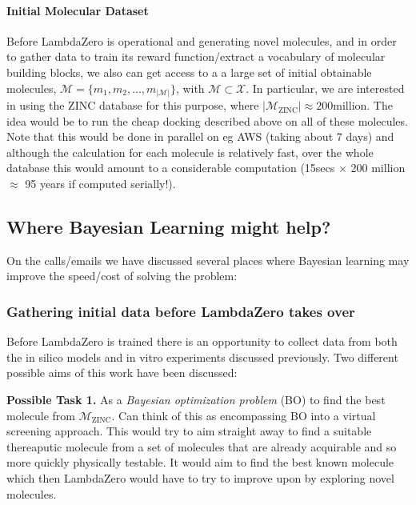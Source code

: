 \documentclass{article}
\begin{document}
\paragraph{Initial Molecular Dataset} Before LambdaZero is operational and generating novel molecules, and in order to gather data to train its reward function/extract a vocabulary of molecular building blocks,
we also can get access to a a large set of initial obtainable molecules, $\mathcal{M} = \{m_1, m_2, \ldots, m_{|\mathcal{M}|}\}$,
with $\mathcal{M} \subset \mathcal{X}$.
In particular, we are interested in using the ZINC database \citep{Irwin2012-gf} for this purpose,
where $|\mathcal{M}_{\textrm{ZINC}}| \approx 200 \textrm{million}$. 
The idea would be to run the cheap docking described above on all of these molecules.
Note that this would be done in parallel on eg AWS (taking about 7 days) and although the calculation for each molecule is relatively fast,
over the whole database
this would amount to a considerable computation (15secs $\times$ 200 million $\approx$ 95 years if computed serially!).

\subsection{Where Bayesian Learning might help?}

On the calls/emails we have discussed several places where Bayesian learning may improve the speed/cost of solving the problem:

\subsubsection{Gathering initial data before LambdaZero takes over}
Before LambdaZero is trained there is an opportunity to collect data from both the in silico models and in vitro experiments 
discussed previously.
Two different possible aims of this work have been discussed:

\vspace{0.1cm}
\noindent
\textbf{Possible Task 1.} As a \emph{Bayesian optimization problem} (BO) \citep{pmlr-v89-song19b, pmlr-v70-hernandez-lobato17a} to find the best molecule from $\mathcal{M}_{\textrm{ZINC}}$.
Can think of this as encompassing BO into a virtual screening approach.
This would try to aim straight away to find a suitable thereaputic molecule from a set of molecules that are already acquirable
and so more quickly physically testable. 
It would aim to find the best known molecule which then LambdaZero would have to try to improve upon by exploring novel molecules.
\end{document}

